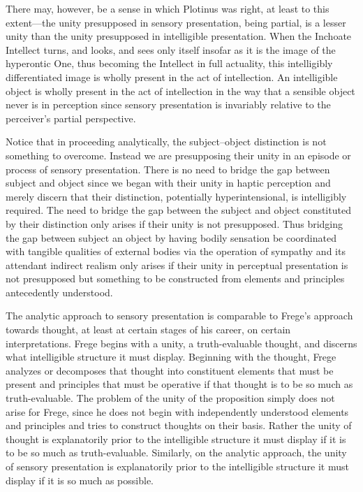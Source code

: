 There may, however, be a sense in which Plotinus was right, at least to this extent---the unity presupposed in sensory presentation, being partial, is a lesser unity than the unity presupposed in intelligible presentation. When the Inchoate Intellect turns, and looks, and sees only itself insofar as it is the image of the hyperontic One, thus becoming the Intellect in full actuality, this intelligibly differentiated image is wholly present in the act of intellection. An intelligible object is wholly present in the act of intellection in the way that a sensible object never is in perception since sensory presentation is invariably relative to the perceiver's partial perspective.


Notice that in proceeding analytically, the subject--object distinction is not something to overcome. Instead we are presupposing their unity in an episode or process of sensory presentation. There is no need to bridge the gap between subject and object since we began with their unity in haptic perception and merely discern that their distinction, potentially hyperintensional, is intelligibly required. The need to bridge the gap between the subject and object constituted by their distinction only arises if their unity is not presupposed. Thus bridging the gap between subject an object by having bodily sensation be coordinated with tangible qualities of external bodies via the operation of sympathy and its attendant indirect realism only arises if their unity in perceptual presentation is not presupposed but something to be constructed from elements and principles antecedently understood. 

The analytic approach to sensory presentation is comparable to Frege's approach towards thought, at least at certain stages of his career, on certain interpretations. Frege begins with a unity, a truth-evaluable thought, and discerns what intelligible structure it must display. Beginning with the thought, Frege analyzes or decomposes that thought into constituent elements that must be present and principles that must be operative if that thought is to be so much as truth-evaluable. The problem of the unity of the proposition simply does not arise for Frege, since he does not begin with independently understood elements and principles and tries to construct thoughts on their basis. Rather the unity of thought is explanatorily prior to the intelligible structure it must display if it is to be so much as truth-evaluable. Similarly, on the analytic approach, the unity of sensory presentation is explanatorily prior to the intelligible structure it must display if it is so much as possible.


